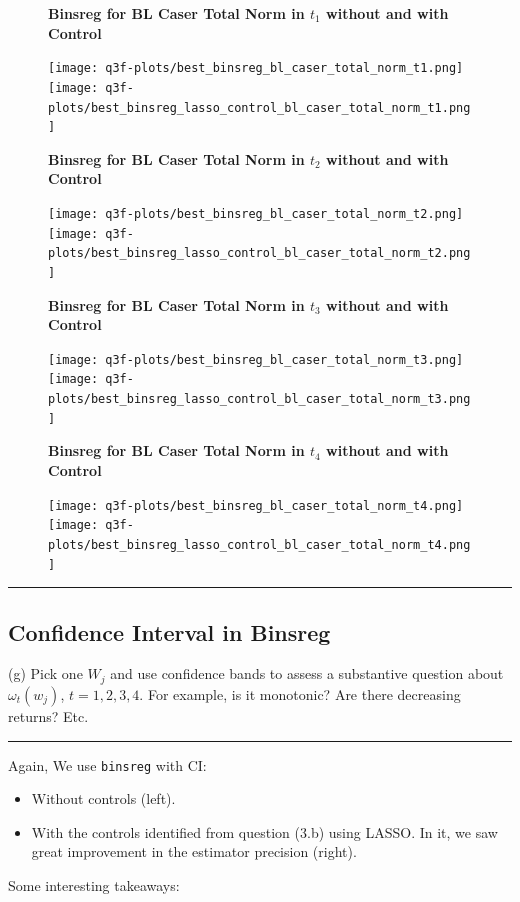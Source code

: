 \documentclass{article}
\newenvironment{colorparagraph}[1]{\par\color{#1}}{\par}
\begin{document}
{\begin{figure}[H]
  \textbf{Binsreg for BL Caser Total Norm in $t_1$ without and with Control}

    \texttt{[image: q3f-plots/best\_binsreg\_bl\_caser\_total\_norm\_t1.png]}
  \texttt{[image: q3f-plots/best\_binsreg\_lasso\_control\_bl\_caser\_total\_norm\_t1.png]}
  
  \textbf{Binsreg for BL Caser Total Norm in $t_2$ without and with Control}

  \texttt{[image: q3f-plots/best\_binsreg\_bl\_caser\_total\_norm\_t2.png]}
  \texttt{[image: q3f-plots/best\_binsreg\_lasso\_control\_bl\_caser\_total\_norm\_t2.png]}
  
  \textbf{Binsreg for BL Caser Total Norm in $t_3$ without and with Control}

  \texttt{[image: q3f-plots/best\_binsreg\_bl\_caser\_total\_norm\_t3.png]}
  \texttt{[image: q3f-plots/best\_binsreg\_lasso\_control\_bl\_caser\_total\_norm\_t3.png]}
  
  \textbf{Binsreg for BL Caser Total Norm in $t_4$ without and with Control}

  \texttt{[image: q3f-plots/best\_binsreg\_bl\_caser\_total\_norm\_t4.png]}
  \texttt{[image: q3f-plots/best\_binsreg\_lasso\_control\_bl\_caser\_total\_norm\_t4.png]}
\end{figure}
}

\begin{colorparagraph}{questioncolor}
\rule{\textwidth}{0.5pt}
\label{q3g}
\subsection{Confidence Interval in Binsreg}
(g) Pick one \( W_j \) and use confidence bands to assess a substantive question about \( \omega_t(w_j) \), \( t = 1, 2, 3, 4 \). For example, is it monotonic? Are there decreasing returns? Etc.

\rule{\textwidth}{0.5pt}
\end{colorparagraph}

Again, We use \texttt{binsreg} with CI:
\begin{itemize}
  \item Without controls (left).
  \item With the controls identified from question (3.b) using LASSO. In it, we saw great improvement in the estimator precision (right).
\end{itemize}

Some interesting takeaways:
\end{document}
